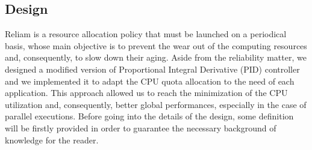 \subsection{Design}
\label{sec:poldesign}
Reliam is a resource allocation policy that must be launched on a periodical basis, whose main objective is to prevent the wear out of the computing resources and, consequently, to slow down their aging. Aside from the reliability matter, we designed a modified version of Proportional Integral Derivative (PID) controller and we implemented it to adapt the CPU quota allocation to the need of each application. This approach allowed us to reach the minimization of the CPU utilization and, consequently, better global performances, especially in the case of parallel executions. Before going into the details of the design, some definition will be firstly provided in order to guarantee the necessary background of knowledge for the reader.

